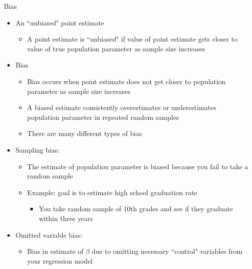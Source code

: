 \begin{frame}[shrink=10]{Bias}
	\begin{itemize}
	\item An ``unbiased" point estimate
		\begin{itemize}
		\item A point estimate is ``unbiased" if value of point estimate gets closer to value of true population parameter as sample size increases
		\end{itemize}
	\item Bias
		\begin{itemize}
		\item Bias occurs when point estimate does not get closer to population parameter as sample size increases
		\item A biased estimate consistently overestimates or underestimates population parameter in repeated random samples
		\item There are many different types of bias
		\end{itemize}
	\item Sampling bias:
		\begin{itemize}
		\item The estimate of population parameter is biased because you fail to take a random sample
		\item Example: goal is to estimate high school graduation rate
			\begin{itemize}
			\item You take random sample of 10th grades and see if they graduate within three years
			\end{itemize}
		\end{itemize}
	\item Omitted variable bias: 
		\begin{itemize}
		\item Bias in estimate of $\beta$ due to omitting necessary ``control" variables from your regression model
		\end{itemize}
	\end{itemize}
\end{frame}

